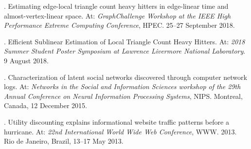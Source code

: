 \begin{innerlist}

\item[] \myname.
	Estimating edge-local triangle count heavy hitters in edge-linear time and almost-vertex-linear space.
	At: \emph{GraphChallenge Workshop at the IEEE High Performance Extreme Computing Conference}, 
	HPEC. 
	25--27 September 2018.

\item[] \myname.
	Efficient Sublinear Estimation of Local Triangle Count Heavy Hitters.
	At: \emph{2018 Summer Student Poster Symposium at Lawrence Livermore National Laboratory}. 
	9 August 2018.

\item[] \myname.
	Characterization of latent social networks discovered through computer network logs.
	At: \emph{Networks in the Social and Information Sciences workshop of the 29th Annual Conference on Neural Information Processing Systems},
	NIPS.
	Montreal, Canada, 
	12 December 2015.

\item[] \myname.
	Utility discounting explains informational website traffic patterns before a hurricane.
	At: \emph{22nd International World Wide Web Conference}, 
	WWW. 
	2013.
	Rio de Janeiro, Brazil,
	13--17 May 2013.

\end{innerlist}
